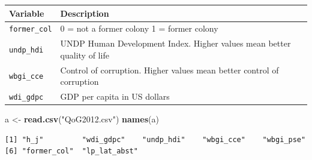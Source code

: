 \documentclass[]{article}
\newenvironment{Shaded}{\begin{snugshade}}{\end{snugshade}}
\newcommand{\KeywordTok}[1]{\textcolor[rgb]{0.13,0.29,0.53}{\textbf{#1}}}
\newcommand{\StringTok}[1]{\textcolor[rgb]{0.31,0.60,0.02}{#1}}
\newcommand{\NormalTok}[1]{#1}
\theoremstyle{definition}
\theoremstyle{definition}
\theoremstyle{definition}
\theoremstyle{remark}
\begin{document}
\begin{longtable}[]{@{}ll@{}}
\toprule
\begin{minipage}[b]{0.10\columnwidth}\raggedright\strut
Variable\strut
\end{minipage} & \begin{minipage}[b]{0.84\columnwidth}\raggedright\strut
Description\strut
\end{minipage}\tabularnewline
\midrule
\endhead
\begin{minipage}[t]{0.10\columnwidth}\raggedright\strut
\texttt{former\_col}\strut
\end{minipage} & \begin{minipage}[t]{0.84\columnwidth}\raggedright\strut
0 = not a former colony 1 = former colony\strut
\end{minipage}\tabularnewline
\begin{minipage}[t]{0.10\columnwidth}\raggedright\strut
\texttt{undp\_hdi}\strut
\end{minipage} & \begin{minipage}[t]{0.84\columnwidth}\raggedright\strut
UNDP Human Development Index. Higher values mean better quality of
life\strut
\end{minipage}\tabularnewline
\begin{minipage}[t]{0.10\columnwidth}\raggedright\strut
\texttt{wbgi\_cce}\strut
\end{minipage} & \begin{minipage}[t]{0.84\columnwidth}\raggedright\strut
Control of corruption. Higher values mean better control of
corruption\strut
\end{minipage}\tabularnewline
\begin{minipage}[t]{0.10\columnwidth}\raggedright\strut
\texttt{wdi\_gdpc}\strut
\end{minipage} & \begin{minipage}[t]{0.84\columnwidth}\raggedright\strut
GDP per capita in US dollars\strut
\end{minipage}\tabularnewline
\bottomrule
\end{longtable}

\begin{Shaded}
\begin{Highlighting}[]
\NormalTok{a <-}\StringTok{ }\KeywordTok{read.csv}\NormalTok{(}\StringTok{"QoG2012.csv"}\NormalTok{)}
\KeywordTok{names}\NormalTok{(a)}
\end{Highlighting}
\end{Shaded}

\begin{verbatim}
[1] "h_j"         "wdi_gdpc"    "undp_hdi"    "wbgi_cce"    "wbgi_pse"   
[6] "former_col"  "lp_lat_abst"
\end{verbatim}
\end{document}
